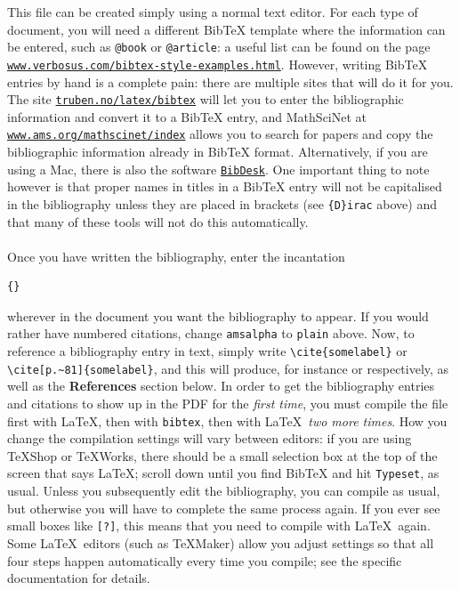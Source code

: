 \documentclass[11pt]{article}
\begin{document}
This file can be created simply using a normal text editor. For each type of document, you will need a different BibTeX template where the information can be entered, such as \verb$@book$ or \verb$@article$: a useful list can be found on the page \href{http://www.verbosus.com/bibtex-style-examples.html}{\texttt{www.verbosus.com/bibtex-style-examples.html}}. However, writing BibTeX entries by hand is a complete pain: there are multiple sites that will do it for you. The site \href{http://truben.no/latex/bibtex}{\texttt{truben.no/latex/bibtex}} will let you to enter the bibliographic information and convert it to a BibTeX entry, and MathSciNet at \href{http://www.ams.org/mathscinet/index}{\texttt{www.ams.org/mathscinet/index}} allows you to search for papers and copy the bibliographic information already in BibTeX format. Alternatively, if you are using a Mac, there is also the software \href{http://bibdesk.sourceforge.net/}{\texttt{BibDesk}}. One important thing to note however is that proper names in titles in a BibTeX entry will not be capitalised in the bibliography unless they are placed in brackets (see \verb${D}irac$ above) and that many of these tools will not do this automatically.

\paragraph{}

Once you have written the bibliography, enter the incantation
\begin{verbatim}
{}

\end{verbatim}
wherever in the document you want the bibliography to appear. If you would rather have numbered citations, change \texttt{amsalpha} to \texttt{plain} above. Now, to reference a bibliography entry in text, simply write \verb$\cite{somelabel}$ or \verb$\cite[p.~81]{somelabel}$, and this will produce, for instance \cite{somelabel} or \cite[p.~81]{somelabel} respectively, as well as the \textbf{References} section below. In order to get the bibliography entries and citations to show up in the PDF for the \textit{first time}, you must compile the file first with \LaTeX , then with \texttt{bibtex}, then with \LaTeX\  \textit{two more times}. How you change the compilation settings  will vary between editors: if you are using TeXShop or TeXWorks, there should be a small selection box at the top of the screen that says \LaTeX; scroll down until you find BibTeX and hit \texttt{Typeset}, as usual. Unless you subsequently edit the bibliography, you can compile as usual, but otherwise you will have to complete the same process again. If you ever see small boxes like \verb$[?]$, this means that you need to compile with \LaTeX\ again. Some \LaTeX\ editors (such as TeXMaker) allow you adjust settings so that all four steps happen automatically every time you compile; see the specific documentation for details.
\end{document}
